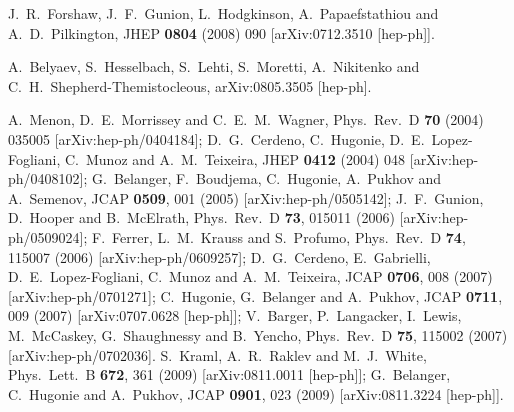 \documentclass[aps,prl,twocolumn,nofootinbib,superscriptaddress]{revtex4}
\begin{document}
\begin{thebibliography}{99}
  J.~R.~Forshaw, J.~F.~Gunion, L.~Hodgkinson, A.~Papaefstathiou and A.~D.~Pilkington,
  JHEP {\bf 0804} (2008) 090
  [arXiv:0712.3510 [hep-ph]].  
  
  A.~Belyaev, S.~Hesselbach, S.~Lehti, S.~Moretti, 
  A.~Nikitenko and C.~H.~Shepherd-Themistocleous,
  arXiv:0805.3505 [hep-ph]. 
  
A.~Menon, D.~E.~Morrissey and C.~E.~M.~Wagner,
  Phys.\ Rev.\  D {\bf 70} (2004) 035005
  [arXiv:hep-ph/0404184];
  D.~G.~Cerdeno, C.~Hugonie, D.~E.~Lopez-Fogliani, C.~Munoz and A.~M.~Teixeira,
  JHEP {\bf 0412} (2004) 048
  [arXiv:hep-ph/0408102];
  G.~Belanger, F.~Boudjema, C.~Hugonie, A.~Pukhov and A.~Semenov,
  JCAP {\bf 0509}, 001 (2005)
  [arXiv:hep-ph/0505142];
  J.~F.~Gunion, D.~Hooper and B.~McElrath,
  Phys.\ Rev.\  D {\bf 73}, 015011 (2006)
  [arXiv:hep-ph/0509024];
  F.~Ferrer, L.~M.~Krauss and S.~Profumo,
  Phys.\ Rev.\  D {\bf 74}, 115007 (2006)
  [arXiv:hep-ph/0609257];
   D.~G.~Cerdeno, E.~Gabrielli, D.~E.~Lopez-Fogliani, C.~Munoz and A.~M.~Teixeira,
  JCAP {\bf 0706}, 008 (2007)
  [arXiv:hep-ph/0701271];
  C.~Hugonie, G.~Belanger and A.~Pukhov,
  JCAP {\bf 0711}, 009 (2007)
  [arXiv:0707.0628 [hep-ph]];
  V.~Barger, P.~Langacker, I.~Lewis, M.~McCaskey, G.~Shaughnessy and B.~Yencho,
  Phys.\ Rev.\  D {\bf 75}, 115002 (2007)
  [arXiv:hep-ph/0702036].
  S.~Kraml, A.~R.~Raklev and M.~J.~White,
  Phys.\ Lett.\  B {\bf 672}, 361 (2009)
  [arXiv:0811.0011 [hep-ph]];
  G.~Belanger, C.~Hugonie and A.~Pukhov,
  JCAP {\bf 0901}, 023 (2009)
  [arXiv:0811.3224 [hep-ph]].
  



\end{thebibliography}
\end{document}
